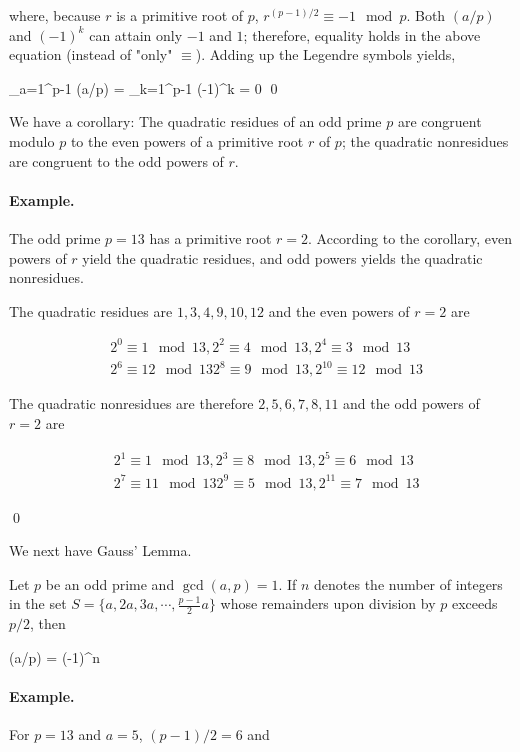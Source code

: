 where, because $r$ is a primitive root of $p$, $r^{(p-1)/2} \equiv -1 \mod p$. Both $(a/p)$ and $(-1)^k$ can attain only $-1$ and $1$; therefore, equality holds in the above equation (instead of "only" $\equiv$). Adding up the Legendre symbols yields,

\bee
\sum_{a=1}^{p-1} (a/p) = \sum_{k=1}^{p-1} (-1)^k = 0 \qed
\eee

We have a corollary: The quadratic residues of an odd prime $p$ are congruent modulo $p$ to the even powers of a primitive root $r$ of $p$; the quadratic nonresidues are congruent to the odd powers of $r$.

\paragraph{Example.} The odd prime $p=13$ has a primitive root $r=2$. According to the corollary, even powers of $r$ yield the quadratic residues, and odd powers yields the quadratic nonresidues.

The quadratic residues are $1, 3, 4, 9, 10, 12$ and the even powers of $r=2$ are

\begin{align*}
& 2^0 \equiv 1 \mod 13, 2^2 \equiv 4 \mod 13, 2^4 \equiv 3 \mod 13 \\
& 2^6 \equiv 12 \mod 13 2^8 \equiv 9 \mod 13, 2^{10} \equiv 12 \mod 13
\end{align*}

The quadratic nonresidues are therefore $2, 5, 6, 7, 8, 11$ and the odd powers of $r=2$ are

\begin{align*}
& 2^1 \equiv 1 \mod 13, 2^3 \equiv 8 \mod 13, 2^5 \equiv 6 \mod 13 \\
& 2^7 \equiv 11 \mod 13 2^9 \equiv 5 \mod 13, 2^{11} \equiv 7 \mod 13
\end{align*}

\qed

We next have Gauss' Lemma.

\begin{theorem}
Let $p$ be an odd prime and $\gcd(a,p)=1$. If $n$ denotes the number of integers in the set $S = \{a, 2a, 3a, \cdots, \frac{p-1}{2}a \}$ whose remainders upon division by $p$ exceeds $p/2$, then

\bee
(a/p) = (-1)^n
\eee

\end{theorem}

\paragraph{Example.} For $p=13$ and $a=5$, $(p-1)/2 = 6$ and

